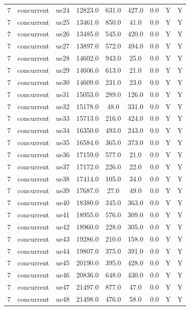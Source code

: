 \begin{table}[ht]
\begin{tabular}{|c|c|c|c|c|c|c|c|c|}
7 & concurrent & ue24 & 12823.0 & 631.0 & 427.0 & 0.0 & Y & Y \\
7 & concurrent & ue25 & 13461.0 & 850.0 & 41.0 & 0.0 & Y & Y \\
7 & concurrent & ue26 & 13485.0 & 545.0 & 420.0 & 0.0 & Y & Y \\
7 & concurrent & ue27 & 13897.0 & 572.0 & 494.0 & 0.0 & Y & Y \\
7 & concurrent & ue28 & 14602.0 & 943.0 & 25.0 & 0.0 & Y & Y \\
7 & concurrent & ue29 & 14606.0 & 613.0 & 21.0 & 0.0 & Y & Y \\
7 & concurrent & ue30 & 14609.0 & 231.0 & 23.0 & 0.0 & Y & Y \\
7 & concurrent & ue31 & 15053.0 & 289.0 & 126.0 & 0.0 & Y & Y \\
7 & concurrent & ue32 & 15178.0 & 48.0 & 331.0 & 0.0 & Y & Y \\
7 & concurrent & ue33 & 15713.0 & 216.0 & 424.0 & 0.0 & Y & Y \\
7 & concurrent & ue34 & 16350.0 & 493.0 & 243.0 & 0.0 & Y & Y \\
7 & concurrent & ue35 & 16584.0 & 365.0 & 373.0 & 0.0 & Y & Y \\
7 & concurrent & ue36 & 17159.0 & 577.0 & 21.0 & 0.0 & Y & Y \\
7 & concurrent & ue37 & 17172.0 & 226.0 & 22.0 & 0.0 & Y & Y \\
7 & concurrent & ue38 & 17414.0 & 105.0 & 34.0 & 0.0 & Y & Y \\
7 & concurrent & ue39 & 17687.0 & 27.0 & 49.0 & 0.0 & Y & Y \\
7 & concurrent & ue40 & 18380.0 & 345.0 & 363.0 & 0.0 & Y & Y \\
7 & concurrent & ue41 & 18955.0 & 576.0 & 309.0 & 0.0 & Y & Y \\
7 & concurrent & ue42 & 18960.0 & 228.0 & 305.0 & 0.0 & Y & Y \\
7 & concurrent & ue43 & 19286.0 & 210.0 & 158.0 & 0.0 & Y & Y \\
7 & concurrent & ue44 & 19807.0 & 375.0 & 391.0 & 0.0 & Y & Y \\
7 & concurrent & ue45 & 20190.0 & 395.0 & 428.0 & 0.0 & Y & Y \\
7 & concurrent & ue46 & 20836.0 & 648.0 & 430.0 & 0.0 & Y & Y \\
7 & concurrent & ue47 & 21497.0 & 877.0 & 47.0 & 0.0 & Y & Y \\
7 & concurrent & ue48 & 21498.0 & 476.0 & 58.0 & 0.0 & Y & Y \\

\end{tabular}
\end{table}
